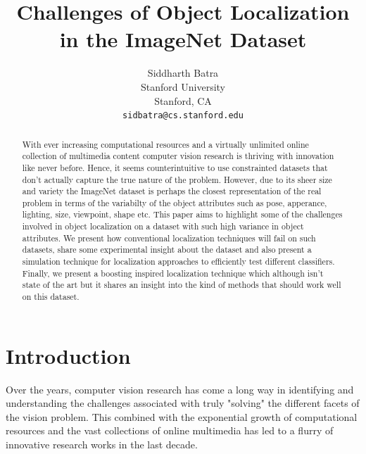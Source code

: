 \documentclass[10pt,twocolumn,letterpaper]{article}
\begin{document}
\title{Challenges of Object Localization in the ImageNet Dataset}

\author{Siddharth Batra\\
Stanford University\\
Stanford, CA\\
{\tt\small sidbatra@cs.stanford.edu}
}

\maketitle
\thispagestyle{empty}

\begin{abstract}
    
   With ever increasing computational resources and a virtually unlimited online collection of multimedia
   content computer vision research is thriving with innovation like never before. Hence, it seems counterintuitive
   to use constrainted datasets that don't actually capture the true nature of the problem. However, due to its sheer size
   and variety the ImageNet dataset is perhaps the closest representation of the real problem in terms of the variabilty of
   the object attributes such as pose, apperance, lighting, size, viewpoint, shape etc. This paper aims to highlight 
   some of the challenges involved in object localization on a dataset with such high variance in object attributes.
   We present how conventional localization techniques will fail on such datasets, share some experimental insight
   about the dataset and also present a simulation technique for localization approaches to efficiently test different classifiers.
   Finally, we present a boosting inspired localization technique which although isn't state of the art but it shares
   an insight into the kind of methods that should work well on this dataset.

\end{abstract}

\section{Introduction}

Over the years, computer vision research has come a long way in identifying
and understanding the challenges associated with truly "solving"
the different facets of the vision problem. This combined with the exponential
growth of computational resources and the vast collections of online multimedia 
has led to a flurry of innovative research works in the last decade.
\end{document}
